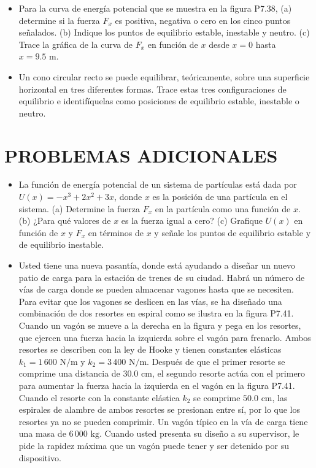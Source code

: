 \documentclass[11pt,a4paper]{article}
\begin{document}
\begin{itemize}
    \item[\textbf{38.}] Para la curva de energía potencial que se muestra en la figura P7.38, (a) determine si la fuerza $F_x$ es positiva, negativa o cero en los cinco puntos señalados. (b) Indique los puntos de equilibrio estable, inestable y neutro. (c) Trace la gráfica de la curva de $F_x$ en función de $x$ desde $x = 0$ hasta $x = 9.5 \text{ m}$.
    \vspace*{7cm}

    \item[\textbf{39.}] Un cono circular recto se puede equilibrar, teóricamente, sobre una superficie horizontal en tres diferentes formas. Trace estas tres configuraciones de equilibrio e identifíquelas como posiciones de equilibrio estable, inestable o neutro.
    \vspace*{6cm}
\end{itemize}

\section*{PROBLEMAS ADICIONALES}

\begin{itemize}
    \item[\textbf{40.}] La función de energía potencial de un sistema de partículas está dada por $U(x) = -x^3 + 2x^2 + 3x$, donde $x$ es la posición de una partícula en el sistema. (a) Determine la fuerza $F_x$ en la partícula como una función de $x$. (b) ¿Para qué valores de $x$ es la fuerza igual a cero? (c) Grafique $U(x)$ en función de $x$ y $F_x$ en términos de $x$ y señale los puntos de equilibrio estable y de equilibrio inestable.
    \vspace*{7cm}

    \item[\textbf{41.}] Usted tiene una nueva pasantía, donde está ayudando a diseñar un nuevo patio de carga para la estación de trenes de su ciudad. Habrá un número de vías de carga donde se pueden almacenar vagones hasta que se necesiten. Para evitar que los vagones se deslicen en las vías, se ha diseñado una combinación de dos resortes en espiral como se ilustra en la figura P7.41. Cuando un vagón se mueve a la derecha en la figura y pega en los resortes, que ejercen una fuerza hacia la izquierda sobre el vagón para frenarlo. Ambos resortes se describen con la ley de Hooke y tienen constantes elásticas $k_1 = 1\,600 \text{ N/m}$ y $k_2 = 3\,400 \text{ N/m}$. Después de que el primer resorte se comprime una distancia de $30.0 \text{ cm}$, el segundo resorte actúa con el primero para aumentar la fuerza hacia la izquierda en el vagón en la figura P7.41. Cuando el resorte con la constante elástica $k_2$ se comprime $50.0 \text{ cm}$, las espirales de alambre de ambos resortes se presionan entre sí, por lo que los resortes ya no se pueden comprimir. Un vagón típico en la vía de carga tiene una masa de $6\,000 \text{ kg}$. Cuando usted presenta su diseño a su supervisor, le pide la rapidez máxima que un vagón puede tener y ser detenido por su dispositivo.
    \vspace*{7cm}
\end{itemize}
\end{document}
